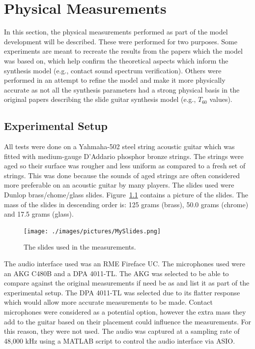 \documentclass[../main.tex]{subfiles}
\begin{document}
\chapter{Physical Measurements}
\label{ch:5}
In this section, the physical measurements performed as part of the model development will be described. These were performed for two purposes. Some experiments are meant to recreate the results from the papers which the model was based on, which help confirm the theoretical aspects which inform the synthesis model (e.g., contact sound spectrum verification). Others were performed in an attempt to refine the model and make it more physically accurate as not all the synthesis parameters had a strong physical basis in the original papers describing the slide guitar synthesis model (e.g., $T_{60}$ values).

\section{Experimental Setup}
\label{sec:Ch5ExpSetup}
All tests were done on a Yahmaha-502 steel string acoustic guitar which was fitted with medium-gauge D'Addario phosphor bronze strings. The strings were aged so their surface was rougher and less uniform as compared to a fresh set of strings. This was done because the sounds of aged strings are often considered more preferable on an acoustic guitar by many players. The slides used were Dunlop brass/chome/glass slides. Figure~\ref{fig:MySlides} contains a picture of the slides. The mass of the slides in descending order is: 125 grams (brass), 50.0 grams (chrome) and 17.5 grams (glass). 

\begin{figure}[h]
    \centering
    \texttt{[image: ./images/pictures/MySlides.png]}
    \caption{The slides used in the measurements.}
    \label{fig:MySlides}
\end{figure}

The audio interface used was an RME Fireface UC. The microphones used were an AKG C480B and a DPA 4011-TL. The AKG was selected to be able to compare against the original measurements if need be as  and  list it as part of the experimental setup. The DPA 4011-TL was selected due to its flatter response which would allow more accurate measurements to be made. Contact microphones were considered as a potential option, however the extra mass they add to the guitar based on their placement could influence the measurements. For this reason, they were not used. The audio was captured at a sampling rate of 48,000 kHz using a MATLAB script to control the audio interface via ASIO.
\end{document}
